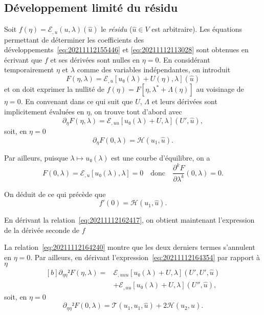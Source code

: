 \documentclass[12pt, final]{amsart}
\begin{document}
\subsection{Développement limité du résidu}
\label{sec:20211112182000}

Soit \(f(η)=ℰ_{,u}(u, \lambda)(\hat{u})\) le \emph{résidu}
(\(\hat{u}∈ V\) est arbitraire). Les équations permettant de déterminer les
coefficients des développements~\eqref{eq:20211112155446} et
\eqref{eq:20211112113028} sont obtenues en écrivant que \(f\) et ses dérivées
sont nulles en \(η=0\). En considérant temporairement \(η\) et
\(\lambda\) comme des variables indépendantes, on introduit
\begin{equation}
  F(η, \lambda)=ℰ_{,u}[u₀(\lambda)+U(η), \lambda](\hat{u})
\end{equation}
et on doit exprimer la nullité de
\(f(η)=F[η, \lambda^\ast+\Lambda(η)]\) au voisinage de \(η=0\). En
convenant dans ce qui suit que \(U\), \(\Lambda\) et leurs dérivées sont
implicitement évaluées en \(η\), on trouve tout d'abord
avec
\begin{equation}
  \label{eq:20211112164354}
  \partial_η F(η, \lambda)
  =ℰ_{,uu}[u₀(\lambda)+U, \lambda](U', \hat{u}),
\end{equation}
soit, en \(η=0\)
\begin{equation}
  \label{eq:20211112165323}
  \partial_η F(0, \lambda)=\mathcal H(u_1, \hat{u}).
\end{equation}

Par ailleurs, puisque \(\lambda\mapsto u₀(\lambda)\) est une courbe d'équilibre, on a
\begin{equation}
  \label{eq:20211112164240}
  F(0, \lambda)=ℰ_{,u}[u₀(\lambda), \lambda]=0
  \quad\text{donc}\quad
  \frac{\partial^kF}{\partial\lambda^k}(0, \lambda)=0.
\end{equation}

On déduit de ce qui précède que
\begin{equation}
  \label{eq:20211112182300}
  f'(0)=\mathcal H(u_1, \hat{u}).
\end{equation}

En dérivant la relation~\eqref{eq:20211112162417}, on obtient maintenant l'expression de la dérivée seconde de \(f\)

La relation~\eqref{eq:20211112164240} montre que les deux derniers termes
s'annulent en \(η=0\). Par ailleurs, en dérivant
l'expression~\eqref{eq:20211112164354} par rapport à \(η\)
\begin{equation}
  \label{eq:20211112172446}
  \begin{aligned}[b]
    \partial_{ηη}²F(η, \lambda)={}&
    ℰ_{,uuu}[u₀(\lambda)+U, \lambda](U', U', \hat{u})\\
    &+ℰ_{,uu}[u₀(\lambda)+U, \lambda](U'', \hat{u}),
  \end{aligned}
\end{equation}
soit, en \(η=0\)
\begin{equation}
  \label{eq:20211112165830}
  \partial_{ηη}²F(0, \lambda)=\mathcal T(u_1, u_1, \hat{u})
  +2\mathcal H(u_2, \hat{u}).
\end{equation}
\end{document}
